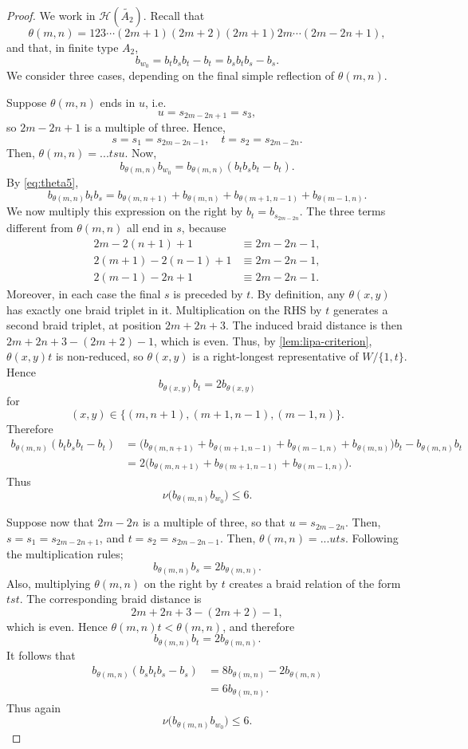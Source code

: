 \documentclass[a4paper,11pt]{amsart}
\let\emph\relax
\newcommand{\Hecke}{\mc H}
\newcommand{\nuop}{\nu}
\newcommand{\mc}{\mathcal}
\numberwithin{equation}{subsection}
\theoremstyle{definition}
\theoremstyle{remark}
\begin{document}
\begin{proof}
We work in $\Hecke(\widetilde{A_2})$. Recall that
\[
\theta(m,n)
=
123\cdots(2m+1)(2m+2)(2m+1)2m\cdots(2m-2n+1),
\]
and that, in finite type \(A_2\),
\[
b_{w_0}=b_tb_sb_t-b_t=b_sb_tb_s-b_s.
\]
We consider three cases, depending on the final simple reflection of
\(\theta(m,n)\).

\smallskip

\noindent\emph{Case 1.}
Suppose \(\theta(m,n)\) ends in \(u\), i.e. 
\[
u=s_{2m-2n+1} = s_3,
\]
so $2m-2n+1$ is a multiple of three. 
Hence,
\[
s= s_1 = s_{2m-2n-1},
\quad
t=s_2=s_{2m-2n}.
\]
Then, $\theta(m,n) = ...tsu$. Now,
\[
b_{\theta(m,n)}b_{w_0}
=
b_{\theta(m,n)}(b_tb_sb_t-b_t).
\]
By \autoref{eq:theta5},
\[
b_{\theta(m,n)}b_tb_s
=
b_{\theta(m,n+1)}
+
b_{\theta(m,n)}
+
b_{\theta(m+1,n-1)}
+
b_{\theta(m-1,n)}.
\]
We now multiply this expression on the right by \(b_t=b_{s_{2m-2n}}\). The three
terms different from \(\theta(m,n)\) all end in \(s\), because
\[
\begin{aligned}
2m-2(n+1)+1 &\equiv 2m-2n-1,\\
2(m+1)-2(n-1)+1 &\equiv 2m-2n-1,\\
2(m-1)-2n+1 &\equiv 2m-2n-1.
\end{aligned}
\]
Moreover, in each case the final \(s\) is preceded by \(t\). By definition, any $\theta(x,y)$ has exactly one braid triplet in it. Multiplication on the RHS by $t$ generates a second braid triplet, at position $2m + 2n + 3$. The induced braid distance is then $2m + 2n + 3 - (2m + 2) - 1$, which is even. Thus, by \autoref{lem:lipa-criterion}, $\theta(x,y)t$ is non-reduced, so $\theta(x,y)$ is a right-longest representative of $W/\{1,t\}$. Hence
\[
b_{\theta(x,y)}b_t=2b_{\theta(x,y)}
\]
for
\[
(x,y)\in\{(m,n+1),(m+1,n-1),(m-1,n)\}.
\]
Therefore
\[
\begin{aligned}
b_{\theta(m,n)}(b_tb_sb_t-b_t)
&=
\bigl(
b_{\theta(m,n+1)}
+
b_{\theta(m+1,n-1)}
+
b_{\theta(m-1,n)}
+
b_{\theta(m,n)}
\bigr)b_t
-
b_{\theta(m,n)}b_t
\\
&=
2\bigl(
b_{\theta(m,n+1)}
+
b_{\theta(m+1,n-1)}
+
b_{\theta(m-1,n)}
\bigr).
\end{aligned}
\]
Thus
\[
\nuop\bigl(b_{\theta(m,n)}b_{w_0}\bigr)\leq 6.
\]

\smallskip

\noindent\emph{Case 2.}
Suppose now that $2m-2n$ is a multiple of three, so that $u = s_{2m-2n}$. Then, $s = s_1 = s_{2m-2n+1}$, and $t=s_2=s_{2m-2n-1}$. Then, $\theta(m,n) = ...uts$. Following the multiplication rules;
\[
b_{\theta(m,n)}b_s=2b_{\theta(m,n)}.
\]
Also, multiplying \(\theta(m,n)\) on the right by \(t\) creates a braid relation
of the form \(tst\). The corresponding braid distance is
\[
2m+2n+3-(2m+2)-1,
\]
which is even. Hence \(\theta(m,n)t<\theta(m,n)\), and therefore
\[
b_{\theta(m,n)}b_t=2b_{\theta(m,n)}.
\]
It follows that
\[
\begin{aligned}
b_{\theta(m,n)}(b_sb_tb_s-b_s)
&=
8b_{\theta(m,n)}-2b_{\theta(m,n)}
\\
&=
6b_{\theta(m,n)}.
\end{aligned}
\]
Thus again
\[
\nuop\bigl(b_{\theta(m,n)}b_{w_0}\bigr)\leq 6.
\]


\end{proof}
\end{document}

